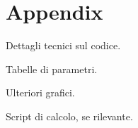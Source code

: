 \chapter{Appendix}

Dettagli tecnici sul codice.

Tabelle di parametri.

Ulteriori grafici.

Script di calcolo, se rilevante.




